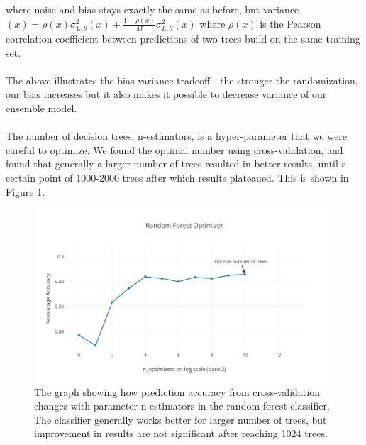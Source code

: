 \documentclass[letterpaper]{article}
\begin{document}
\noindent where noise and bias stays exactly the same as before, but variance$(x) = \rho(x) \sigma^2_{L,\theta}(x) + \frac{1-\rho(x)}{M}\sigma^2_{L,\theta}(x)$ where $\rho(x)$ is the Pearson correlation coefficient between predictions of two trees build on the same training set.\\
\\
The above illustrates the bias-variance tradeoff - the stronger the randomization, our bias increases but it also makes it possible to decrease variance of our ensemble model.\\
\\
The number of decision trees, n-estimators, is a hyper-parameter that we were careful to optimize. We found the optimal number using cross-validation, and found that generally a larger number of trees resulted in better results, until a certain point of 1000-2000 trees after which results plateaued. This is shown in Figure \ref{fig:random_forest_optimizer}.

\begin{figure}
\includegraphics[scale=0.5]{random_forest_optimizer.png}
\caption{The graph showing how prediction accuracy from cross-validation changes with parameter n-estimators in the random forest classifier. The classifier generally works better for larger number of trees, but improvement in results are not significant after reaching 1024 trees.}
\label{fig:random_forest_optimizer}
\end{figure}

\end{document}
